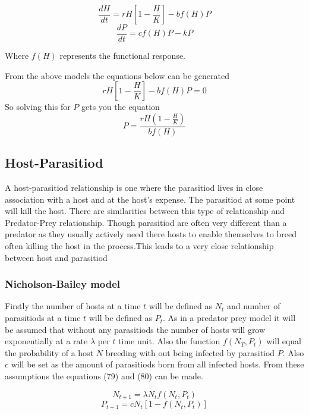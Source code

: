 \documentclass[final]{cmpreport}
\begin{document}
	\begin{equation} \frac{dH}{dt}=rH[1-\frac{H}{K}]-bf(H)P\end{equation} 
	\begin{equation} \frac{dP}{dt}=cf(H)P-kP \end{equation}  
	
	Where $f(H)$ represents the functional response.
	
	From the above models the equations below can be generated
	\begin{equation}rH[1-\frac{H}{K}]-bf(H)P = 0 \end{equation} 
	So solving this for $P$ gets you the equation
	\begin{equation} P = \frac{rH(1-\frac{H}{K})}{bf(H) }  \end{equation} 
	
	
	
	\subsection{Host-Parasitiod}
	A host-parasitiod relationship is one where the parasitiod lives in close association with a host 	and at the host's expense. The parasitiod at some point will kill the host. There are similarities between this type of relationship and Predator-Prey relationship. Though parasitiod are often very different than a predator as they usually actively need there hosts to  enable themselves to breed often killing the host in the process.This leads to a very close relationship between host and parasitiod
	
	
	\subsubsection{Nicholson-Bailey model}
	
	Firstly the number of hosts at a time $t$ will be defined as  $N_t$ and number of parasitiods at a time $t$ will be defined as $P_t$. As in a predator prey model it will be assumed that without any parasitiods the number of hosts will grow exponentially at a rate $\lambda$ per $t$ time unit. Also the function $f(N_T,P_t)$ will equal the probability of a host $N$  breeding with out being infected by parasitiod $P$. Also $c$ will be set as the amount of parasitiods born from all infected hosts. From these assumptions the equations (79) and (80) can be made.
	
	\begin{equation} N_{t+1}=\lambda N_tf(N_t,P_t) \end{equation} 
	\begin{equation} P_{t+1}=cN_t[1-f(N_t,P_t)] \end{equation} 
	 
\end{document}
